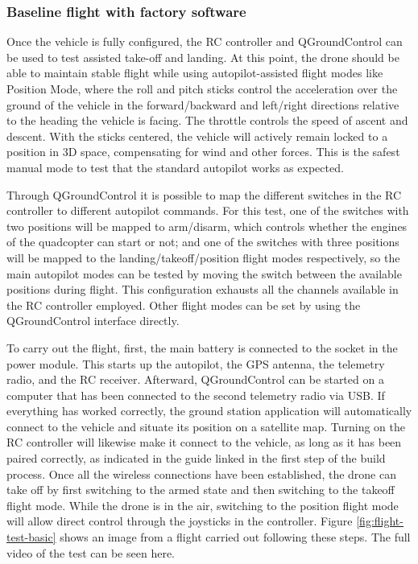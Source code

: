 
\subsubsection{Baseline flight with factory software}
\label{subsec:fl-test-1}

Once the vehicle is fully configured, the RC controller and QGroundControl can be used to test assisted take-off and landing.
At this point, the drone should be able to maintain stable flight while using autopilot-assisted flight modes like Position Mode, where the roll and pitch sticks control the acceleration over the ground of the vehicle in the forward/backward and left/right directions relative to the heading the vehicle is facing.
The throttle controls the speed of ascent and descent. 
With the sticks centered, the vehicle will actively remain locked to a position in 3D space, compensating for wind and other forces.
This is the safest manual mode to test that the standard autopilot works as expected.

Through QGroundControl it is possible to map the different switches in the RC controller to different autopilot commands.
For this test, one of the switches with two positions will be mapped to arm/disarm, which controls whether the engines of the quadcopter can start or not; and one of the switches with three positions will be mapped to the landing/takeoff/position flight modes respectively, so the main autopilot modes can be tested by moving the switch between the available positions during flight.
This configuration exhausts all the channels available in the RC controller employed.
Other flight modes can be set by using the QGroundControl interface directly.

To carry out the flight, first, the main battery is connected to the socket in the power module.
This starts up the autopilot, the GPS antenna, the telemetry radio, and the RC receiver.
Afterward, QGroundControl can be started on a computer that has been connected to the second telemetry radio via USB.
If everything has worked correctly, the ground station application will automatically connect to the vehicle and situate its position on a satellite map.
Turning on the RC controller will likewise make it connect to the vehicle, as long as it has been paired correctly, as indicated in the guide linked in the first step of the build process.
Once all the wireless connections have been established, the drone can take off by first switching to the armed state and then switching to the takeoff flight mode.
While the drone is in the air, switching to the position flight mode will allow direct control through the joysticks in the controller.
Figure \ref{fig:flight-test-basic} shows an image from a flight carried out following these steps.
The full video of the test can be seen here.

